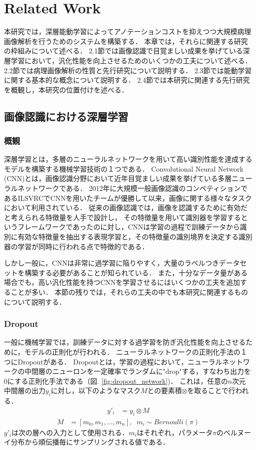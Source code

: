 \section{Related Work}
本研究では，深層能動学習によってアノテーションコストを抑えつつ大規模病理画像解析を行うためのシステムを構築する．
本章では，それらに関連する研究の枠組みについて述べる．
2.1節では画像認識で目覚ましい成果を挙げている深層学習において，汎化性能を向上させるためのいくつかの工夫について述べる．
2.2節では病理画像解析の性質と先行研究について説明する．
2.3節では能動学習に関する基本的な概念について説明する．
2.4節では本研究に関連する先行研究を概観し，本研究の位置付けを述べる．

\subsection{画像認識における深層学習}
\subsubsection{概観}
深層学習とは，多層のニューラルネットワークを用いて高い識別性能を達成するモデルを構築する機械学習技術の１つである．
Convolutional Neural Network (CNN)とは，画像認識分野において近年目覚ましい成果を挙げている多層ニューラルネットワークである．
2012年に大規模一般画像認識のコンペティションであるILSVRC\cite{ILSVRC15}でCNNを用いたチームが優勝して以来，画像に関する様々なタスクにおいて利用されている．
従来の画像認識では，画像を認識するために有効だと考えられる特徴量を人手で設計し，
その特徴量を用いて識別器を学習するというフレームワークであったのに対し，CNNは学習の過程で訓練データから識別に有効な特徴量を抽出する表現学習と，その特徴量の識別境界を決定する識別器の学習が同時に行われる点で特徴的である．

しかし一般に，CNNは非常に過学習に陥りやすく，大量のラベルつきデータセットを構築する必要があることが知られている．
また，十分なデータ量がある場合でも，高い汎化性能を持つCNNを学習させるにはいくつかの工夫を追加することが多い．
本節の残りでは，それらの工夫の中でも本研究に関連するものについて説明する．

\subsubsection{\textbf{Dropout}}
一般に機械学習では，訓練データに対する過学習を防ぎ汎化性能を向上させるために，モデルの正則化が行われる．
ニューラルネットワークの正則化手法の１つにDropout\cite{hinton2012improving, srivastava2014dropout}がある．
Dropoutとは，学習の過程において，ニューラルネットワークの中間層のニューロンを一定確率でランダムに"drop"する，すなわち出力を0にする正則化手法である（図. \ref{fig:dropout_network})．
これは，任意の$n$次元中間層の出力$y_i$に対し，以下のようなマスク$M$との要素積$\otimes$を取ることで行われる．
\begin{eqnarray*}
    y'_i &= y_i \otimes M 
\end{eqnarray*}
\begin{eqnarray*}
    M &= [m_0, m_1, \dots, m_n],\;\; m_i \sim Bernoulli(\pi) 
\end{eqnarray*}
$y'_i$は次の層への入力として使用される．$m_i$はそれぞれ，パラメータ$\pi$のベルヌーイ分布から順伝播毎にサンプリングされる値である．

